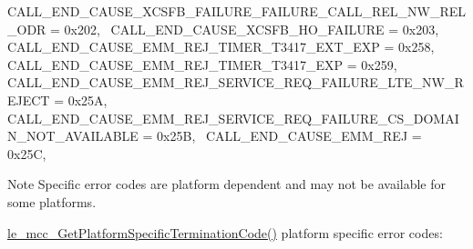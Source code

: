 \begin{DoxyItemize}
 C\+A\+L\+L\+\_\+\+E\+N\+D\+\_\+\+C\+A\+U\+S\+E\+\_\+X\+C\+S\+F\+B\+\_\+\+F\+A\+I\+L\+U\+R\+E\+\_\+\+F\+A\+I\+L\+U\+R\+E\+\_\+\+C\+A\+L\+L\+\_\+\+R\+E\+L\+\_\+\+N\+W\+\_\+\+R\+E\+L\+\_\+\+O\+DR = 0x202,~\newline
 C\+A\+L\+L\+\_\+\+E\+N\+D\+\_\+\+C\+A\+U\+S\+E\+\_\+X\+C\+S\+F\+B\+\_\+\+H\+O\+\_\+\+F\+A\+I\+L\+U\+RE = 0x203,~\newline
 C\+A\+L\+L\+\_\+\+E\+N\+D\+\_\+\+C\+A\+U\+S\+E\+\_\+\+E\+M\+M\+\_\+\+R\+E\+J\+\_\+\+T\+I\+M\+E\+R\+\_\+\+T3417\+\_\+\+E\+X\+T\+\_\+\+E\+XP = 0x258,~\newline
 C\+A\+L\+L\+\_\+\+E\+N\+D\+\_\+\+C\+A\+U\+S\+E\+\_\+\+E\+M\+M\+\_\+\+R\+E\+J\+\_\+\+T\+I\+M\+E\+R\+\_\+\+T3417\+\_\+\+E\+XP = 0x259,~\newline
 C\+A\+L\+L\+\_\+\+E\+N\+D\+\_\+\+C\+A\+U\+S\+E\+\_\+\+E\+M\+M\+\_\+\+R\+E\+J\+\_\+\+S\+E\+R\+V\+I\+C\+E\+\_\+\+R\+E\+Q\+\_\+\+F\+A\+I\+L\+U\+R\+E\+\_\+\+L\+T\+E\+\_\+\+N\+W\+\_\+\+R\+E\+J\+E\+CT = 0x25A,~\newline
 C\+A\+L\+L\+\_\+\+E\+N\+D\+\_\+\+C\+A\+U\+S\+E\+\_\+\+E\+M\+M\+\_\+\+R\+E\+J\+\_\+\+S\+E\+R\+V\+I\+C\+E\+\_\+\+R\+E\+Q\+\_\+\+F\+A\+I\+L\+U\+R\+E\+\_\+\+C\+S\+\_\+\+D\+O\+M\+A\+I\+N\+\_\+\+N\+O\+T\+\_\+\+A\+V\+A\+I\+L\+A\+B\+LE = 0x25B,~\newline
 C\+A\+L\+L\+\_\+\+E\+N\+D\+\_\+\+C\+A\+U\+S\+E\+\_\+\+E\+M\+M\+\_\+\+R\+EJ = 0x25C,~\newline

\end{DoxyItemize}

\begin{DoxyNote}{Note}
Specific error codes are platform dependent and may not be available for some platforms.
\end{DoxyNote}
\hyperlink{le__mcc__interface_8h_a68b9b8ed1b221924dcea1be0fd610a54}{le\+\_\+mcc\+\_\+\+Get\+Platform\+Specific\+Termination\+Code()} platform specific error codes\+:

